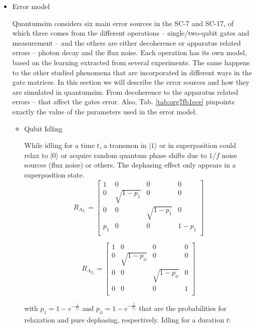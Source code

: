 \begin{itemize}
\item Error model
\label{sec:org71ccb8e}

Quantumsim considers six main error sources in the SC-7 and SC-17, of which three comes from the different operations -- single/two-qubit gates and measurement -- and the others are either decoherence or apparatus related errors -- photon decay and the flux noise.
Each operation has its own model, based on the learning extracted from several experiments.
The same happens to the other studied phenomena that are incorporated in different ways in the gate matrices.
In this section we will describe the error sources and how they are simulated in quantumsim.
From decoherence to the apparatus related errors -- that affect the gates error.
Also, Tab. \ref{tab:org7fb1ece} pinpoints exactly the value of the parameters used in the error model.


\begin{itemize}
\item Qubit Idling
\label{sec:orge01ac94}

While idling for a time \(t\), a transmon in \(|1\rangle\) or in superposition could relax to \(|0\rangle\) or acquire random quantum phase shifts due to \(1/f\) noise sources (flux noise) or others.
The dephasing effect only appears in a superposition state.
\begin{equation}
\label{eq:orgd891a01}
R_{\Lambda_{T_1}} = \begin{bmatrix}
 1 & 0 & 0 & 0 \\
 0 & \sqrt{1 - p_1} & 0 & 0 \\
 0 & 0 & \sqrt{1 - p_1} & 0 \\
 p_1 & 0 & 0 & 1 - p_1 \\
\end{bmatrix}
\end{equation}

\begin{equation}
\label{eq:org3cd78f7}
R_{\Lambda_{T_{\phi}}} = \begin{bmatrix}
 1 & 0 & 0 & 0 \\
 0 & \sqrt{1 - p_{\phi}} & 0 & 0 \\
 0 & 0 & \sqrt{1 - p_{\phi}} & 0 \\
 0 & 0 & 0 & 1 \\
\end{bmatrix}
\end{equation}

with \(p_1 = 1 - e^{-\frac{t}{T_1}}\) and \(p_{\phi} = 1 - e^{-\frac{t}{T_{\phi}}}\) that are the probabilities for relaxation and pure dephasing, respectively.
Idling for a duration \(t\):


\end{itemize}
\end{itemize}
